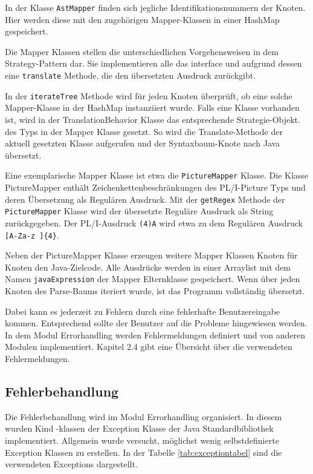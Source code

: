 In der Klasse \verb+AstMapper+ finden sich jegliche Identifikationsnummern der Knoten. Hier werden diese mit den zugehörigen Mapper-Klassen in einer HashMap gespeichert.

Die Mapper Klassen stellen die unterschiedlichen Vorgehensweisen in dem Strategy-Pattern dar. Sie implementieren alle das  interface und aufgrund dessen eine \verb+translate+ Methode, die den übersetzten Ausdruck zurückgibt. 

In der \verb+iterateTree+ Methode wird für jeden Knoten überprüft, ob eine solche Mapper-Klasse in der HashMap instanziiert wurde.
Falls eine Klasse vorhanden ist, wird in der TranslationBehavior Klasse das entsprechende Strategie-Objekt.
des Typs  in der
Mapper Klasse gesetzt. So wird die Translate-Methode der aktuell gesetzten Klasse aufgerufen und der Syntaxbaum-Knote nach Java übersetzt.

Eine exemplarische Mapper Klasse ist etwa die \verb+PictureMapper+ Klasse. Die Klasse PictureMapper enthält Zeichenkettenbeschränkungen des PL/I-Picture Typs und deren Übersetzung als Regulären Ausdruck.
Mit der \verb+getRegex+ Methode der \verb+PictureMapper+ Klasse wird der übersetzte Reguläre Ausdruck als String zurückgegeben.
Der PL/I-Ausdruck \verb+(4)A+ wird etwa zu dem Regulären Ausdruck \verb+[A-Za-z ]{4}+.   


Neben der PictureMapper Klasse erzeugen weitere Mapper Klassen Knoten für Knoten den Java-Zielcode. 
Alle Ausdrücke werden in einer Arraylist mit dem Namen \verb+javaExpression+ der Mapper Elternklasse  gespeichert.
Wenn über jeden Knoten des Parse-Baums iteriert wurde, ist das Programm vollständig übersetzt.


Dabei kann es jederzeit zu Fehlern durch eine fehlerhafte Benutzereingabe kommen.
Entsprechend sollte der Benutzer auf die Probleme hingewiesen werden.
In dem Modul Errorhandling werden Fehlermeldungen definiert und von anderen Modulen implementiert. Kapitel 2.4 gibt eine Übersicht über die verwendeten Fehlermeldungen.

\pagebreak

\subsection{Fehlerbehandlung}
Die Fehlerbehandlung wird im Modul Errorhandling organisiert.
In diesem wurden Kind \newline -klassen der Exception Klasse der Java Standardbibliothek implementiert.
Allgemein wurde versucht, möglichst wenig selbstdefinierte Exception Klassen zu erstellen.
In der Tabelle \ref{tab:exceptiontabel} sind die verwendeten Exceptions dargestellt.

